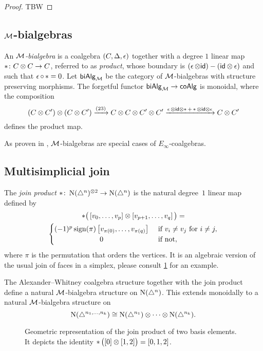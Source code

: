 \begin{proof}
	TBW 
\end{proof}

\subsection{$\mathcal{M}$-bialgebras}

An \textit{$\mathcal{M}$-bialgebra} is a coalgebra $(C, \operatorname{\Delta}, \operatorname{\epsilon})$ together with a degree $1$ linear map $\operatorname{\ast} \colon C \otimes C \to C$, referred to as \textit{product}, whose boundary is $(\operatorname{\epsilon} \otimes \mathsf{id}) - (\mathsf{id} \otimes \operatorname{\epsilon})$ and such that $\operatorname{\epsilon} \circ \operatorname{\ast} = 0$.
Let $\mathsf{biAlg}_{\mathcal{M}}$ be the category of $\mathcal{M}$-bialgebras with structure preserving morphisms.
The forgetful functor $\mathsf{biAlg}_{\mathcal{M}} \to \mathsf{coAlg}$ is monoidal, where the composition
\[
(C \otimes C^\prime) \otimes (C \otimes C^\prime) \xrightarrow{(23)}
C \otimes C \otimes C^\prime \otimes C^\prime
\xrightarrow{\operatorname{\epsilon} \otimes \mathsf{id} \otimes \operatorname{\ast} + \operatorname{\ast} \otimes \mathsf{id} \otimes \operatorname{\epsilon}}
C \otimes C^\prime
\]
defines the product map.

As proven in \cite{medina2020prop1}, $\mathcal{M}$-bialgebras are special cases of $E_\infty$-coalgebras.

\subsection{Multisimplicial join}

The \textit{join product} $\ast \colon \operatorname{N}(\triangle^n)^{\otimes 2} \to \operatorname{N}(\triangle^n)$ is the natural degree~$1$ linear map defined by
\begin{multline}
\ast \big(\left[v_0, \dots, v_p \right] \ot \left[v_{p+1}, \dots, v_q\right]\big) = \\
\begin{cases} (-1)^{p} \sign(\pi) \left[v_{\pi(0)}, \dots, v_{\pi(q)}\right] & \text{ if } v_i \neq v_j \text{ for } i \neq j, \\
\hfil 0 & \text{ if not}, \end{cases}
\end{multline}
where $\pi$ is the permutation that orders the vertices.
It is an algebraic version of the usual join of faces in a simplex, please consult \cref{f:join of faces} for an example.

The Alexander--Whitney coalgebra structure together with the join product define a natural $\mathcal{M}$-bialgebra structure on $\operatorname{N}(\triangle^n)$. This extends monoidally to a natural $\mathcal{M}$-bialgebra structure on
\[
\operatorname{N}(\triangle^{n_1, \dots, n_k}) \cong
\operatorname{N}(\triangle^{n_1}) \otimes \dotsb \otimes \operatorname{N}(\triangle^{n_k}).
\]

\begin{figure}
	
	\caption{Geometric representation of the join product of two basis elements. It depicts the identity $\operatorname{\ast} \big( [0] \otimes [1,2] \big) = [0,1,2]$.}
	\label{f:join of faces}
\end{figure}